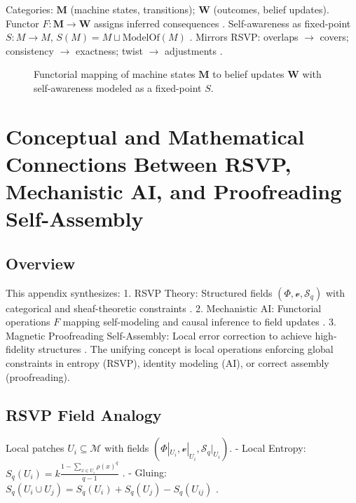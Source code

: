 \documentclass{article}
\theoremstyle{plain}
\theoremstyle{definition}
\begin{document}
{Categories: $\mathbf{M}$ (machine states, transitions); $\mathbf{W}$ (outcomes, belief updates). 
Functor $F: \mathbf{M} \to \mathbf{W}$ assigns inferred consequences \cite{Spivak2014}. 
Self-awareness as fixed-point $S: M \to M$, $S(M) = M \sqcup \text{ModelOf}(M)$ \cite{Bennett2025}. 
Mirrors RSVP: overlaps $\to$ covers; consistency $\to$ exactness; twist $\to$ adjustments \cite{MacLane1992,Awodey2010}.

\begin{figure}[H]
\centering
{}
\caption{Functorial mapping of machine states $\mathbf{M}$ to belief updates $\mathbf{W}$ with self-awareness modeled as a fixed-point $S$.}
\label{fig:mechanistic-functor}
\end{figure}

\section{Conceptual and Mathematical Connections Between RSVP, Mechanistic AI, and Proofreading Self-Assembly}

\subsection{Overview}
This appendix synthesizes:
1. RSVP Theory: Structured fields $(\Phi, \mathcal{v}, \mathcal{S}_q)$ with categorical and sheaf-theoretic constraints \cite{Soares2024}.
2. Mechanistic AI: Functorial operations $F$ mapping self-modeling and causal inference to field updates \cite{Bennett2025}.
3. Magnetic Proofreading Self-Assembly: Local error correction to achieve high-fidelity structures \cite{Liang2025}.
The unifying concept is local operations enforcing global constraints in entropy (RSVP), identity modeling (AI), or correct assembly (proofreading).

\subsection{RSVP Field Analogy}
Local patches $U_i \subseteq \mathcal{M}$ with fields $(\Phi|_{U_i}, \mathcal{v}|_{U_i}, \mathcal{S}_q|_{U_i})$.
- Local Entropy: $S_q(U_i) = k \frac{1 - \sum_{x \in U_i} \rho(x)^q}{q-1}$ \cite{Tsallis1988}.
- Gluing: $S_q(U_i \cup U_j) = S_q(U_i) + S_q(U_j) - S_q(U_{ij})$ \cite{MacLane1992}.

}
\end{document}
